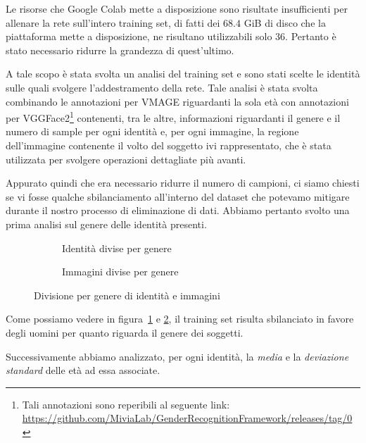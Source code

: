 Le risorse che Google Colab mette a disposizione sono risultate insufficienti per allenare la rete sull'intero training set, di fatti dei $68.4$ GiB di disco che la piattaforma mette a disposizione, ne risultano utilizzabili solo $36$. Pertanto è stato necessario ridurre la grandezza di quest'ultimo.

A tale scopo è stata svolta un analisi del training set e sono stati scelte le identità sulle quali svolgere l'addestramento della rete. Tale analisi è stata svolta combinando le annotazioni per VMAGE riguardanti la sola età con annotazioni per VGGFace2\footnote{Tali annotazioni sono reperibili al seguente link: \url{https://github.com/MiviaLab/GenderRecognitionFramework/releases/tag/0}} contenenti, tra le altre, informazioni riguardanti il genere e il numero di sample per ogni identità e, per ogni immagine, la regione dell'immagine contenente il volto del soggetto ivi rappresentato, che è stata utilizzata per svolgere operazioni dettagliate più avanti.

Appurato quindi che era necessario ridurre il numero di campioni, ci siamo chiesti se vi fosse qualche sbilanciamento all'interno del dataset che potevamo mitigare durante il nostro processo di eliminazione di dati. Abbiamo pertanto svolto una prima analisi sul genere delle identità presenti.

\begin{figure}[ht]

\begin{subfigure}{0.5\textwidth}
\def\svgscale{0.5}

\caption{Identità divise per genere}
\label{sfig:Ids per gender}
\end{subfigure}
\begin{subfigure}{0.5\textwidth}
\def\svgscale{0.5}

\caption{Immagini divise per genere}
\label{sfig:Images per gender}
\end{subfigure}
\caption{Divisione per genere di identità e immagini}
\label{fig:gender_division}
\end{figure}

Come possiamo vedere in figura~\ref{sfig:Ids per gender} e \ref{sfig:Images per gender}, il training set risulta sbilanciato in favore degli uomini per quanto riguarda il genere dei soggetti.

Successivamente abbiamo analizzato, per ogni identità, la \emph{media} e la \emph{deviazione standard} delle età ad essa associate.

